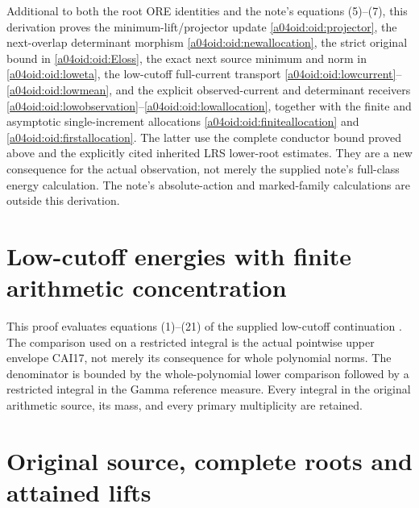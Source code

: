 \documentclass[11pt,a4paper]{article}
\providecommand{\PP}{\mathcal P}
\providecommand{\norm}[1]{\left\lVert#1\right\rVert}
\begin{document}
Additional to both the root ORE identities and the note's equations
(5)--(7), this derivation proves the minimum-lift/projector update
\eqref{a04oid:oid:projector}, the next-overlap determinant morphism
\eqref{a04oid:oid:newallocation}, the strict original bound in
\eqref{a04oid:oid:Eloss}, the exact next source minimum and norm in
\eqref{a04oid:oid:loweta}, the low-cutoff full-current transport
\eqref{a04oid:oid:lowcurrent}--\eqref{a04oid:oid:lowmean}, and the explicit
observed-current and determinant receivers
\eqref{a04oid:oid:lowobservation}--\eqref{a04oid:oid:lowallocation}, together with
the finite and asymptotic single-increment allocations
\eqref{a04oid:oid:finiteallocation} and \eqref{a04oid:oid:firstallocation}.
The latter use the complete conductor bound proved above and the
explicitly cited inherited LRS lower-root estimates. They are a new
consequence for the actual observation, not merely the supplied
note's full-class energy calculation. The note's absolute-action
and marked-family calculations are outside this derivation.




\endgroup

\clearpage
\begingroup
\def\C{\mathbb C}
\def\R{\mathbb R}
\def\PP{\mathcal P}
\def\norm#1{\left\lVert#1\right\rVert}
\def\ip#1#2{\left\langle#1,#2\right\rangle}
\def\cond{\operatorname{cond}}

\setcounter{equation}{0}
\renewcommand{\theequation}{A04LCS.\arabic{equation}}
\section*{Low-cutoff energies with finite arithmetic concentration}


This proof evaluates equations (1)--(21) of the supplied low-cutoff
continuation \cite{a04lcs:lce}. The comparison used on a restricted integral is
the actual pointwise upper envelope CAI17, not merely its consequence
for whole polynomial norms. The denominator is bounded by the
whole-polynomial lower comparison followed by a restricted integral in
the Gamma reference measure. Every integral in the original arithmetic
source, its mass, and every primary multiplicity are retained.

\section{Original source, complete roots and attained lifts}
\end{document}
